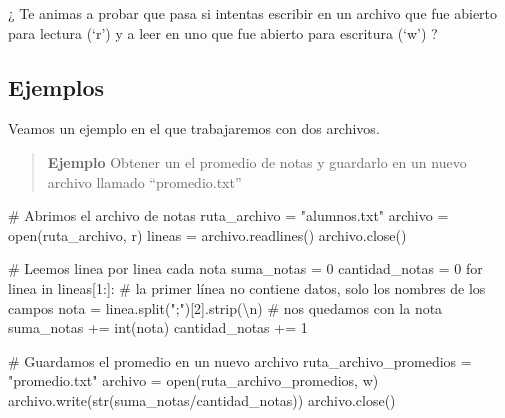 \documentclass[
  letterpaper,
  DIV=11,
  numbers=noendperiod]{scrreprt}
\newenvironment{Shaded}{\begin{snugshade}}{\end{snugshade}}
\newcommand{\BuiltInTok}[1]{\textcolor[rgb]{0.00,0.23,0.31}{#1}}
\newcommand{\CharTok}[1]{\textcolor[rgb]{0.13,0.47,0.30}{#1}}
\newcommand{\CommentTok}[1]{\textcolor[rgb]{0.37,0.37,0.37}{#1}}
\newcommand{\ControlFlowTok}[1]{\textcolor[rgb]{0.00,0.23,0.31}{#1}}
\newcommand{\DecValTok}[1]{\textcolor[rgb]{0.68,0.00,0.00}{#1}}
\newcommand{\KeywordTok}[1]{\textcolor[rgb]{0.00,0.23,0.31}{#1}}
\newcommand{\NormalTok}[1]{\textcolor[rgb]{0.00,0.23,0.31}{#1}}
\newcommand{\OperatorTok}[1]{\textcolor[rgb]{0.37,0.37,0.37}{#1}}
\newcommand{\StringTok}[1]{\textcolor[rgb]{0.13,0.47,0.30}{#1}}
\begin{document}
\begin{tcolorbox}[enhanced jigsaw, bottomrule=.15mm, leftrule=.75mm, opacityback=0, colback=white, toprule=.15mm, bottomtitle=1mm, opacitybacktitle=0.6, rightrule=.15mm, left=2mm, arc=.35mm, coltitle=black, title=\textcolor{quarto-callout-tip-color}{\faLightbulb}\hspace{0.5em}{Tip}, breakable, toptitle=1mm, colframe=quarto-callout-tip-color-frame, titlerule=0mm, colbacktitle=quarto-callout-tip-color!10!white]

¿ Te animas a probar que pasa si intentas escribir en un archivo que fue
abierto para lectura (`r') y a leer en uno que fue abierto para
escritura (`w') ?

\end{tcolorbox}

\subsection{Ejemplos}\label{ejemplos-1}

Veamos un ejemplo en el que trabajaremos con dos archivos.

\begin{quote}
\textbf{Ejemplo} Obtener un el promedio de notas y guardarlo en un nuevo
archivo llamado ``promedio.txt''
\end{quote}

\begin{Shaded}
\begin{Highlighting}[]
\CommentTok{\# Abrimos el archivo de notas}
\NormalTok{ruta\_archivo }\OperatorTok{=} \StringTok{"alumnos.txt"}
\NormalTok{archivo }\OperatorTok{=} \BuiltInTok{open}\NormalTok{(ruta\_archivo, }\StringTok{\textquotesingle{}r\textquotesingle{}}\NormalTok{)}
\NormalTok{lineas }\OperatorTok{=}\NormalTok{ archivo.readlines()}
\NormalTok{archivo.close()}

\CommentTok{\# Leemos linea por linea cada nota }
\NormalTok{suma\_notas }\OperatorTok{=} \DecValTok{0}
\NormalTok{cantidad\_notas }\OperatorTok{=} \DecValTok{0}
\ControlFlowTok{for}\NormalTok{ linea }\KeywordTok{in}\NormalTok{ lineas[}\DecValTok{1}\NormalTok{:]: }\CommentTok{\# la primer línea no contiene datos, solo los nombres de los campos}
\NormalTok{  nota }\OperatorTok{=}\NormalTok{ linea.split(}\StringTok{";"}\NormalTok{)[}\DecValTok{2}\NormalTok{].strip(}\StringTok{\textquotesingle{}}\CharTok{\textbackslash{}n}\StringTok{\textquotesingle{}}\NormalTok{) }\CommentTok{\# nos quedamos con la nota}
\NormalTok{  suma\_notas }\OperatorTok{+=} \BuiltInTok{int}\NormalTok{(nota)}
\NormalTok{  cantidad\_notas }\OperatorTok{+=} \DecValTok{1}

\CommentTok{\# Guardamos el promedio en un nuevo archivo}
\NormalTok{ruta\_archivo\_promedios }\OperatorTok{=} \StringTok{"promedio.txt"}
\NormalTok{archivo }\OperatorTok{=} \BuiltInTok{open}\NormalTok{(ruta\_archivo\_promedios, }\StringTok{\textquotesingle{}w\textquotesingle{}}\NormalTok{)}
\NormalTok{archivo.write(}\BuiltInTok{str}\NormalTok{(suma\_notas}\OperatorTok{/}\NormalTok{cantidad\_notas))}
\NormalTok{archivo.close()}
\end{Highlighting}
\end{Shaded}
\end{document}
